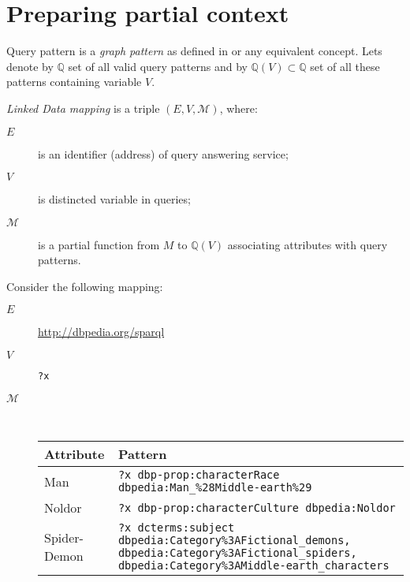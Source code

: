 \documentclass{llncs}
\newcommand{\mapping}{\mathcal{M}}
\begin{document}
\section{Preparing partial context}

\begin{definition}
Query pattern is a \emph{graph pattern} as defined in \cite{sparql11-ql} or any equivalent concept. Lets denote by $\mathbb{Q}$ set of all valid query patterns and by $\mathbb{Q}(V)\subset\mathbb{Q}$ set of all these patterns containing variable $V$.
\end{definition}

\begin{definition}
\emph{Linked Data mapping} is a triple $(E,V,\mapping)$, where:
\begin{description}
\item[$E$] is an identifier (address) of query answering service;
\item[$V$] is distincted variable in queries;
\item[$\mapping$] is a partial function from $M$ to $\mathbb{Q}(V)$ associating attributes with query patterns.
\end{description}
\end{definition}

\begin{example}
Consider the following mapping:
\begin{description}
\item[$E$] \url{http://dbpedia.org/sparql}
\item[$V$] \texttt{?x}
\item[$\mapping$] ~\\ \begin{tabular}{p{}p{}}
Attribute & Pattern \\
\hline
Man & \texttt{?x dbp-prop:characterRace dbpedia:Man\_\%28Middle-earth\%29} \\
Noldor & \texttt{?x dbp-prop:characterCulture dbpedia:Noldor} \\
Spider-Demon & \texttt{?x dcterms:subject dbpedia:Category\%3AFictional\_demons, dbpedia:Category\%3AFictional\_spiders, dbpedia:Category\%3AMiddle-earth\_characters}
\end{tabular}
\end{description}
\end{example}
\end{document}
